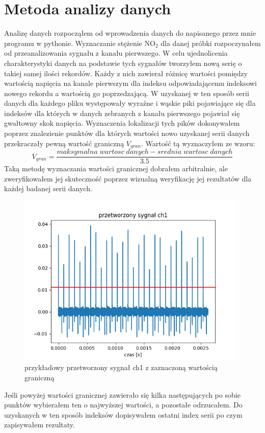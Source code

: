 \documentclass[10pt,a4paper]{article}
\begin{document}
\section{Metoda analizy danych}
\label{method}
Analizę danych rozpocząłem od  wprowadzenia danych do napisanego przez mnie programu w pythonie. 
Wyznaczanie stężenie $\text{NO}_{\text{2}}$ dla danej próbki rozpoczynałem od przeanalizowania sygnału z kanału pierwszego.  W celu ujednolicenia charakterystyki danych na podstawie tych sygnałów tworzyłem nową serię o takiej samej ilości rekordów. Każdy z nich zawierał różnicę wartości pomiędzy wartością napięcia na kanale pierwszym dla indeksu odpowiadającemu indeksowi nowego rekordu a wartością go poprzedzającą. W uzyskanej w ten sposób serii danych dla każdego pliku występowały wyraźne i wąskie piki pojawiające się dla indeksów dla których w danych zebranych z kanału pierwszego pojawiał się gwałtowny skok napięcia.
Wyznaczenia lokalizacji tych pików dokonywałem poprzez znalezienie punktów dla których wartości nowo uzyskanej serii danych przekraczały pewną wartość graniczną $V_{gran}$. Wartość tą wyznaczyłem ze wzoru:
\begin{equation}
    \label{tresh}
    V_{gran} = \frac{maksymalna\; wartosc\; danych - srednia\; wartosc\; danych}{3.5}
\end{equation}
Taką metodę wyznaczania wartości granicznej dobrałem arbitralnie, ale zweryfikowałem jej skuteczność poprzez wizualną weryfikację jej rezultatów dla każdej badanej serii danych.
\begin{figure}[h]
    \centering
    \includegraphics[width=11cm]{pictures/thresh.png}
    \caption{przykładowy przetworzony sygnał ch1 z zaznaczoną wartością graniczną}
    \label{tresh}
\end{figure}
 Jeśli powyżej wartości granicznej zawierało się kilka następujących po sobie punktów wybierałem ten o najwyższej wartości, a pozostałe odrzucałem. Do uzyskanych w ten sposób indeksów dopisywałem ostatni index serii po czym zapisywałem rezultaty. 
\end{document}
